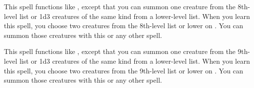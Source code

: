 \spelleffect This spell functions like , except that you can summon one creature from the 8th-level list or 1d3 creatures of the same kind from a lower-level list. When you learn this spell, you choose two creatures from the 8th-level list or lower on . You can summon those creatures with this or any other  spell.

\spelleffect This spell functions like , except that you can summon one creature from the 9th-level list or 1d3 creatures of the same kind from a lower-level list. When you learn this spell, you choose two creatures from the 9th-level list or lower on . You can summon those creatures with this or any other  spell.

